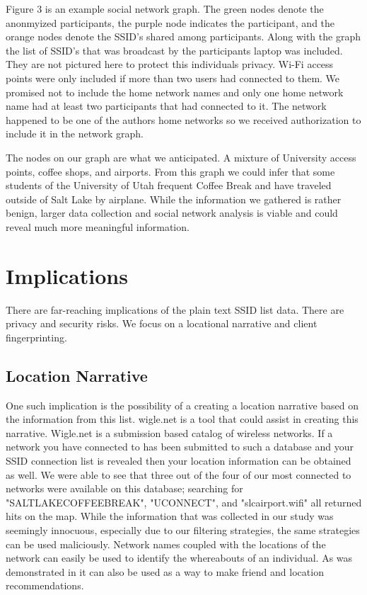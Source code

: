 \documentclass[letterpaper,twocolumn,10pt]{article}
\begin{document}
Figure 3 is an example social network graph. The green nodes denote the anonmyized participants, the purple node indicates the participant, and the orange nodes denote the SSID's shared among participants. Along with the graph the list of SSID's that was broadcast by the participants laptop was included. They are not pictured here to protect this individuals privacy. Wi-Fi access points were only included if more than two users had connected to them. We promised not to include the home network names and only one home network name had at least two participants that had connected to it. The network happened to be one of the authors home networks so we received authorization to include it in the network graph. 

The nodes on our graph are what we anticipated. A mixture of University access points, coffee shops, and airports. From this graph we could infer that some students of the University of Utah frequent Coffee Break and have traveled outside of Salt Lake by airplane. While the information we gathered is rather benign, larger data collection and social network analysis is viable and could reveal much more meaningful information. 

\section{Implications}

There are far-reaching implications of the plain text SSID list data. There are privacy and security risks. We focus on a locational narrative and client fingerprinting.

\subsection{Location Narrative}
 One such implication is the possibility of a creating a location narrative based on  the information from this list. 
wigle.net is a tool that could assist in creating this narrative. Wigle.net is a 
submission based catalog of wireless networks. If a network you have connected to has been 
submitted to such a database and your SSID connection list is revealed then your location 
information can be obtained as well. We were able to see that three out of the four of our
most connected to networks were available on this database; searching for "SALTLAKECOFFEEBREAK", 
"UCONNECT", and "slcairport.wifi" all returned hits on the map. 
While the information that was collected in our study was seemingly innocuous, especially 
due to our filtering strategies, the same strategies can be used maliciously. 
Network names coupled with the locations of the network can easily be used to identify 
the whereabouts of an individual. As was demonstrated in \cite{li} it can also be used as a way to make friend and location recommendations.
\end{document}

